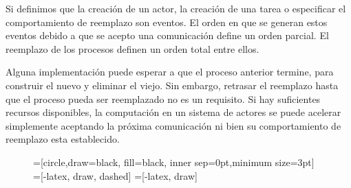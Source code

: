 Si definimos que la creación de un actor, la creación de una tarea o especificar el comportamiento de reemplazo son eventos. El orden en que se generan estos eventos debido a que se acepto una comunicación define un orden parcial. El reemplazo de los procesos definen un orden total entre ellos. 

Alguna implementación puede esperar a que el proceso anterior termine, para construir el nuevo y eliminar el viejo. Sin embargo, retrasar el reemplazo hasta que el proceso pueda ser reemplazado no es un requisito. Si hay suficientes recursos disponibles, la computación en un sistema de actores se puede acelerar simplemente aceptando la próxima comunicación ni bien su comportamiento de reemplazo esta establecido.

\begin{figure}[H]
\centering

=[circle,draw=black, fill=black, inner sep=0pt,minimum size=3pt]
=[-latex, draw, dashed]
=[-latex, draw]

\begin{subfigure}{.5\textwidth}
\centering
{}

\caption{  }
\label{fig:actores:crecion:a}
\end{subfigure}%
\begin{subfigure}{.5\textwidth}

\centering
{}
\end{subfigure}
\end{figure}
